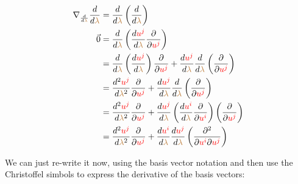 \begin{align*}
    \nabla_{\frac{d}{d\begingroup\color{brown}\lambda\endgroup}}\frac{d}{d\begingroup\color{brown}\lambda\endgroup} 
    &= \frac{d}{d\begingroup\color{brown}\lambda\endgroup} \left(\frac{d}{d\begingroup\color{brown}\lambda\endgroup}\right)\\
    \vec{0} &= \frac{d}{d\begingroup\color{brown}\lambda\endgroup} \left(\frac{d\begingroup\color{red}u^j\endgroup}{d\begingroup\color{brown}\lambda\endgroup} \frac{\partial}{\partial\begingroup\color{red}u^j\endgroup}\right)\\
    &= \frac{d}{d\begingroup\color{brown}\lambda\endgroup} \left(\frac{d\begingroup\color{red}u^j\endgroup}{d\begingroup\color{brown}\lambda\endgroup}\right)\frac{\partial}{\partial\begingroup\color{red}u^j\endgroup} + 
    \frac{d\begingroup\color{red}u^j\endgroup}{d\begingroup\color{brown}\lambda\endgroup}\frac{d}{d\begingroup\color{brown}\lambda\endgroup}\left(\frac{\partial}{\partial\begingroup\color{red}u^j\endgroup}\right)\\
    &= \frac{d^2\begingroup\color{red}u^j\endgroup}{d\begingroup\color{brown}\lambda\endgroup^2}\frac{\partial}{\partial\begingroup\color{red}u^j\endgroup} + 
    \frac{d\begingroup\color{red}u^j\endgroup}{d\begingroup\color{brown}\lambda\endgroup}\frac{d}{d\begingroup\color{brown}\lambda\endgroup}\left(\frac{\partial}{\partial\begingroup\color{red}u^j\endgroup}\right)\\
    &= \frac{d^2\begingroup\color{red}u^j\endgroup}{d\begingroup\color{brown}\lambda\endgroup^2}\frac{\partial}{\partial\begingroup\color{red}u^j\endgroup} + 
    \frac{d\begingroup\color{red}u^j\endgroup}{d\begingroup\color{brown}\lambda\endgroup} \left(\frac{d\begingroup\color{red}u^i\endgroup}{d\begingroup\color{brown}\lambda\endgroup} \frac{\partial}{\partial\begingroup\color{red}u^i\endgroup}\right)\left(\frac{\partial}{\partial\begingroup\color{red}u^j\endgroup}\right)\\
    &= \frac{d^2\begingroup\color{red}u^j\endgroup}{d\begingroup\color{brown}\lambda\endgroup^2}\frac{\partial}{\partial\begingroup\color{red}u^j\endgroup} + 
    \frac{d\begingroup\color{red}u^i\endgroup}{d\begingroup\color{brown}\lambda\endgroup} \frac{d\begingroup\color{red}u^j\endgroup}{d\begingroup\color{brown}\lambda\endgroup} \left(\frac{\partial^2}{\partial\begingroup\color{red}u^i\endgroup \partial\begingroup\color{red}u^j\endgroup}\right)
\end{align*}

We can just re-write it now, using the basis vector notation and then use the Christoffel simbols to express 
the derivative of the basis vectors:

